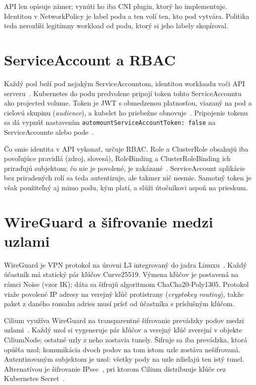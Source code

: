 API len opisuje zámer; vynúti ho iba CNI plugin, ktorý ho implementuje. Identitou v NetworkPolicy je label podu a ten volí ten, kto pod vytvára. Politika teda nerozlíši legitímny workload od podu, ktorý si jeho labely skopíroval.

\section{ServiceAccount a RBAC}
\label{sec:sa-rbac}

Každý pod beží pod nejakým ServiceAccountom, identitou workloadu voči API serveru~\cite{k8s-sa-concepts}. Kubernetes do podu predvolene pripojí token tohto ServiceAccountu ako projected volume. Token je JWT s obmedzenou platnosťou, viazaný na pod a cieľovú skupinu (\emph{audience}), a kubelet ho priebežne obnovuje~\cite{k8s-projected-volumes,k8s-authentication}. Pripojenie tokenu sa dá vypnúť nastavením \texttt{automountServiceAccountToken: false} na ServiceAccounte alebo pode~\cite{k8s-serviceaccounts}.

Čo smie identita v API vykonať, určuje RBAC. Role a ClusterRole obsahujú iba povoľujúce pravidlá (zdroj, slovesá), RoleBinding a ClusterRoleBinding ich priraďujú subjektom; čo nie je povolené, je zakázané~\cite{k8s-rbac}. ServiceAccount aplikácie bez priradených rolí sa teda autentizuje, ale takmer nič nesmie. Samotný token je však použiteľný aj mimo podu, kým platí, a slúži útočníkovi aspoň na prieskum.

\section{WireGuard a šifrovanie medzi uzlami}
\label{sec:wireguard}

WireGuard je VPN protokol na úrovni L3 integrovaný do jadra Linuxu~\cite{donenfeld2017wireguard}. Každý účastník má statický pár kľúčov Curve25519. Výmena kľúčov je postavená na rámci Noise (vzor IK); dáta sa šifrujú algoritmom ChaCha20-Poly1305. Protokol viaže povolené IP adresy na verejný kľúč protistrany (\emph{cryptokey routing}), takže paket z daného rozsahu adries musí prísť od účastníka s príslušným kľúčom.

Cilium využíva WireGuard na transparentné šifrovanie prevádzky podov medzi uzlami~\cite{cilium-wireguard}. Každý uzol si vygeneruje pár kľúčov a verejný kľúč zverejní v objekte CiliumNode; ostatné uzly z neho zostavia tunely. Šifruje sa iba prevádzka, ktorá opúšťa uzol; komunikácia dvoch podov na tom istom uzle zostáva nešifrovaná. Autentizovaným subjektom je uzol: všetky pody na uzle zdieľajú ten istý tunel. Alternatívou je šifrovanie IPsec~\cite{rfc4301}, pri ktorom Cilium distribuuje kľúče cez Kubernetes Secret~\cite{cilium-ipsec}.

